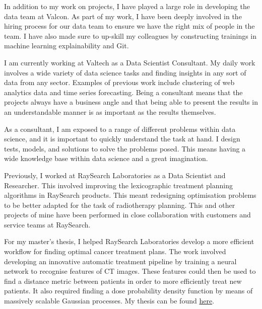 \documentclass[10pt,a4paper,sans]{moderncv}
\begin{document}
In addition to my work on projects, I have played a large role in developing the data team at Valcon. As part of my work, I have been deeply involved in the hiring process for our data team to ensure we have the right mix of people in the team. I have also made sure to up-skill my colleagues by constructing trainings in machine learning explainability and Git.

I am currently working at Valtech as a Data Scientist Consultant. My daily work involves a wide variety of data science tasks and finding insights in any sort of data from any sector. Examples of previous work include clustering of web analytics data and time series forecasting. Being a consultant means that the projects always have a business angle and that being able to present the results in an understandable manner is as important as the results themselves.

\hspace{7 mm} As a consultant, I am exposed to a range of different problems within data science, and it is important to quickly understand the task at hand. I design tests, models, and solutions to solve the problems posed. This means having a wide knowledge base within data science and a great imagination.

\hspace{7 mm} Previously, I worked at RaySearch Laboratories as a Data Scientist and Researcher. This involved improving the lexicographic treatment planning algorithms in RaySearch products. This meant redesigning optimisation problems to be better adapted for the task of radiotherapy planning. This and other projects of mine have been performed in close collaboration with customers and service teams at RaySearch.

\hspace{7 mm} For my master's thesis, I helped RaySearch Laboratories develop a more efficient workflow for finding optimal cancer treatment plans. The work involved developing an innovative automatic treatment pipeline by training a neural network to recognise features of CT images. These features could then be used to find a distance metric between patients in order to more efficiently treat new patients. It also required finding a dose probability density function by means of massively scalable Gaussian processes. My thesis can be found \textcolor{blue}{\href{https://drive.google.com/drive/folders/1JjBF6XcXok5LDPZ22D-DIVR6z7qP2Ux0}{here}}.

\end{document}
